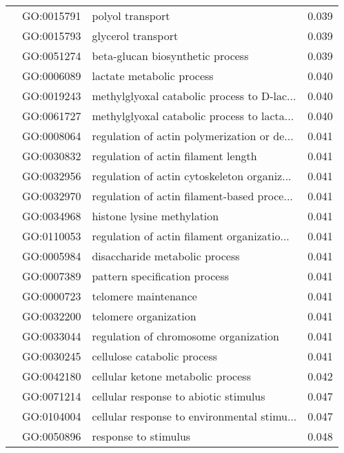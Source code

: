 \begin{longtable}{lllr}
   & GO:0015791 &                             polyol transport &         0.039 \\
   & GO:0015793 &                           glycerol transport &         0.039 \\
   & GO:0051274 &             beta-glucan biosynthetic process &         0.039 \\
   & GO:0006089 &                    lactate metabolic process &         0.040 \\
   & GO:0019243 &  methylglyoxal catabolic process to D-lac... &         0.040 \\
   & GO:0061727 &  methylglyoxal catabolic process to lacta... &         0.040 \\
   & GO:0008064 &  regulation of actin polymerization or de... &         0.041 \\
   & GO:0030832 &          regulation of actin filament length &         0.041 \\
   & GO:0032956 &  regulation of actin cytoskeleton organiz... &         0.041 \\
   & GO:0032970 &  regulation of actin filament-based proce... &         0.041 \\
   & GO:0034968 &                   histone lysine methylation &         0.041 \\
   & GO:0110053 &  regulation of actin filament organizatio... &         0.041 \\
   & GO:0005984 &               disaccharide metabolic process &         0.041 \\
   & GO:0007389 &                pattern specification process &         0.041 \\
   & GO:0000723 &                         telomere maintenance &         0.041 \\
   & GO:0032200 &                        telomere organization &         0.041 \\
   & GO:0033044 &        regulation of chromosome organization &         0.041 \\
   & GO:0030245 &                  cellulose catabolic process &         0.041 \\
   & GO:0042180 &            cellular ketone metabolic process &         0.042 \\
   & GO:0071214 &        cellular response to abiotic stimulus &         0.047 \\
   & GO:0104004 &  cellular response to environmental stimu... &         0.047 \\
   & GO:0050896 &                         response to stimulus &         0.048 \\

\end{longtable}
